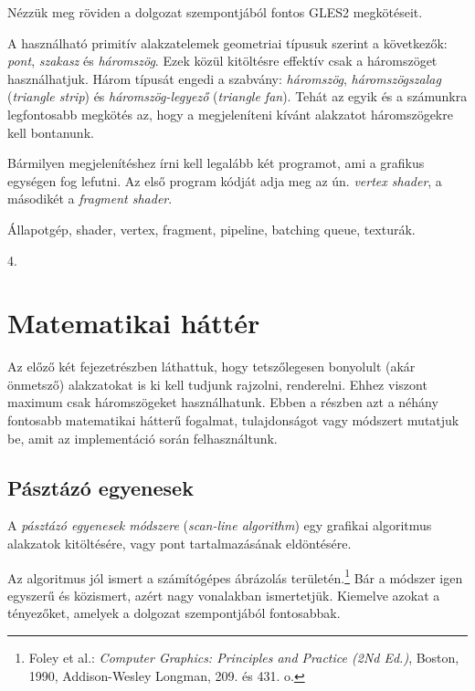 \documentclass[12pt]{report}
\theoremstyle{definition}
\newcommand{\inenglish}[1]{\textsl{#1}}
\begin{document}
Nézzük meg röviden a dolgozat szempontjából fontos GLES2 megkötéseit.

A használható primitív alakzatelemek geometriai típusuk szerint a következők:
\emph{pont}, \emph{szakasz} és \emph{háromszög}. Ezek közül kitöltésre effektív
csak a háromszöget használhatjuk. Három típusát engedi a szabvány:
\emph{háromszög}, \emph{háromszögszalag} (\inenglish{triangle strip}) és
\emph{háromszög-legyező} (\inenglish{triangle fan}). Tehát az egyik és a
számunkra legfontosabb megkötés az, hogy a megjeleníteni kívánt alakzatot
háromszögekre kell bontanunk.

Bármilyen megjelenítéshez írni kell legalább két programot, ami a grafikus
egységen fog lefutni. Az első program kódját adja meg az ún. \emph{vertex
shader}, a másodikét a \emph{fragment shader}.

  \begin{description}[noitemsep]
    \item[Kulcsszavak] Állapotgép, shader, vertex, fragment, pipeline, batching
    queue, texturák.
    \item[Becsült oldalszám] 4.
  \end{description}

    \section[Matematikai háttér]{Matematikai háttér}
    \label{Matematikai háttér}

Az előző két fejezetrészben láthattuk, hogy tetszőlegesen bonyolult (akár
önmetsző) alakzatokat is ki kell tudjunk rajzolni, renderelni. Ehhez viszont
maximum csak háromszögeket használhatunk. Ebben a részben azt a néhány
fontosabb matematikai hátterű fogalmat, tulajdonságot vagy módszert mutatjuk
be, amit az implementáció során felhasználtunk.

    \subsection*{Pásztázó egyenesek}
    \label{Pásztázó egyenesek}

A \emph{pásztázó egyenesek módszere} (\inenglish{scan-line algorithm}) egy
grafikai algoritmus alakzatok kitöltésére, vagy pont tartalmazásának
eldöntésére.

Az algoritmus jól ismert a számítógépes ábrázolás területén.\footnote{Foley et
al.: \emph{Computer Graphics: Principles and Practice (2Nd Ed.)}, Boston, 1990,
Addison-Wesley Longman, 209. és 431. o.} Bár a módszer igen egyszerű és
közismert, azért nagy vonalakban ismertetjük. Kiemelve azokat a tényezőket,
amelyek a dolgozat szempontjából fontosabbak.
\end{document}

